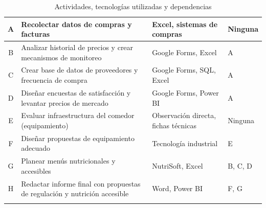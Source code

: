 \documentclass[letterpaper, 11pt]{report}
\begin{document}
\begin{longtable}{|c|p{.3\linewidth}|p{.3\linewidth}|p{.3\linewidth}|}
      A                                                                         & Recolectar datos de compras y facturas & Excel, sistemas de compras  &
      Ninguna                                                                                                                                                                  \\ \hline B  & Analizar historial de precios y crear mecanismos de
      monitoreo                                                                 & Google Forms, Excel                    & A                                                   \\ \hline C                           & Crear base de datos de
      proveedores y frecuencia de compra                                        & Google Forms, SQL, Excel               & A                                                   \\ \hline D                                                        &
      Diseñar encuestas de satisfacción y levantar precios de mercado           & Google Forms,
      Power BI                                                                  & A                                                                                            \\ \hline E                             & Evaluar infraestructura del comedor (equipamiento) &
      Observación directa, fichas técnicas                                      & Ninguna                                                                                      \\ \hline F                 & Diseñar propuestas
      de equipamiento adecuado                                                  & Tecnología industrial                  & E                                                   \\ \hline G                         & Planear
      menús nutricionales y accesibles                                          & NutriSoft, Excel                       & B, C, D                                             \\ \hline H                                                                  &
      Redactar informe final con propuestas de regulación y nutrición accesible &
      Word, Power BI                                                            & F, G                                                                                         \\ \hline

      \caption{Actividades, tecnologías utilizadas y dependencias}
\end{longtable}
\end{document}
